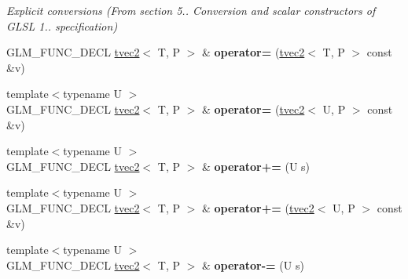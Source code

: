 \begin{DoxyCompactItemize}
\begin{DoxyCompactList}\small\item\em Explicit conversions (From section 5.. Conversion and scalar constructors of G\+L\+SL 1.. specification) \end{DoxyCompactList}\item 
G\+L\+M\+\_\+\+F\+U\+N\+C\+\_\+\+D\+E\+CL \hyperlink{structglm_1_1detail_1_1tvec2}{tvec2}$<$ T, P $>$ \& {\bfseries operator=} (\hyperlink{structglm_1_1detail_1_1tvec2}{tvec2}$<$ T, P $>$ const \&v)\hypertarget{structglm_1_1detail_1_1tvec2_aa28bba513156a189b4232806e7b6858e}{}\label{structglm_1_1detail_1_1tvec2_aa28bba513156a189b4232806e7b6858e}

\item 
{\footnotesize template$<$typename U $>$ }\\G\+L\+M\+\_\+\+F\+U\+N\+C\+\_\+\+D\+E\+CL \hyperlink{structglm_1_1detail_1_1tvec2}{tvec2}$<$ T, P $>$ \& {\bfseries operator=} (\hyperlink{structglm_1_1detail_1_1tvec2}{tvec2}$<$ U, P $>$ const \&v)\hypertarget{structglm_1_1detail_1_1tvec2_ac45d730db8173a1fe3b738bf4ac07fb3}{}\label{structglm_1_1detail_1_1tvec2_ac45d730db8173a1fe3b738bf4ac07fb3}

\item 
{\footnotesize template$<$typename U $>$ }\\G\+L\+M\+\_\+\+F\+U\+N\+C\+\_\+\+D\+E\+CL \hyperlink{structglm_1_1detail_1_1tvec2}{tvec2}$<$ T, P $>$ \& {\bfseries operator+=} (U s)\hypertarget{structglm_1_1detail_1_1tvec2_ada190d862b2574a8d77b0d795d0af619}{}\label{structglm_1_1detail_1_1tvec2_ada190d862b2574a8d77b0d795d0af619}

\item 
{\footnotesize template$<$typename U $>$ }\\G\+L\+M\+\_\+\+F\+U\+N\+C\+\_\+\+D\+E\+CL \hyperlink{structglm_1_1detail_1_1tvec2}{tvec2}$<$ T, P $>$ \& {\bfseries operator+=} (\hyperlink{structglm_1_1detail_1_1tvec2}{tvec2}$<$ U, P $>$ const \&v)\hypertarget{structglm_1_1detail_1_1tvec2_a5bf9b1beecee7857fa22de1c8600e619}{}\label{structglm_1_1detail_1_1tvec2_a5bf9b1beecee7857fa22de1c8600e619}

\item 
{\footnotesize template$<$typename U $>$ }\\G\+L\+M\+\_\+\+F\+U\+N\+C\+\_\+\+D\+E\+CL \hyperlink{structglm_1_1detail_1_1tvec2}{tvec2}$<$ T, P $>$ \& {\bfseries operator-\/=} (U s)\hypertarget{structglm_1_1detail_1_1tvec2_a790ae20229848462d697e3cd2247cb6d}{}\label{structglm_1_1detail_1_1tvec2_a790ae20229848462d697e3cd2247cb6d}


\end{DoxyCompactItemize}
